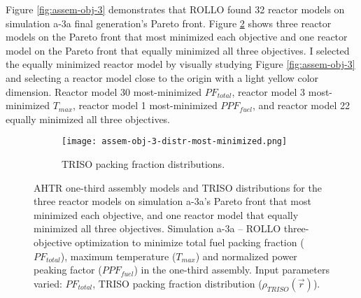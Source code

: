 Figure \ref{fig:assem-obj-3} demonstrates that \gls{ROLLO} found 32 reactor models on 
simulation a-3a final generation's Pareto front. 
Figure \ref{fig:assem-obj-3-most-minimized} shows three reactor models on the 
Pareto front that most minimized each objective and one reactor model on the 
Pareto front that equally minimized all three objectives. 
I selected the equally minimized reactor model by visually studying Figure 
\ref{fig:assem-obj-3} and selecting a reactor model close to the origin 
with a light yellow color dimension. 
Reactor model 30 most-minimized $PF_{total}$, reactor model 3 most-minimized $T_{max}$, 
reactor model 1 most-minimized $PPF_{fuel}$, and reactor model 22 equally minimized 
all three objectives. 
\begin{figure}[htbp!]
    \centering
    \begin{subfigure}{\textwidth}
    \centering
    \texttt{[image: assem-obj-3-distr-most-minimized.png]}
    \caption{TRISO packing fraction distributions.}
    \label{fig:assem-obj-3-most-minimized-distr}
    \end{subfigure}
    \caption{AHTR one-third assembly models and TRISO distributions for the three reactor 
    models on simulation a-3a's Pareto front that most minimized each objective, and 
    one reactor model that equally minimized all three objectives.
    Simulation a-3a -- ROLLO three-objective optimization to minimize total fuel packing 
    fraction ($PF_{total}$), maximum temperature ($T_{max}$) and 
    normalized power peaking factor ($PPF_{fuel}$) in the one-third assembly. 
    Input parameters varied: $PF_{total}$, TRISO packing fraction distribution
    ($\rho_{TRISO}(\vec{r})$).}
    \label{fig:assem-obj-3-most-minimized}
\end{figure}
